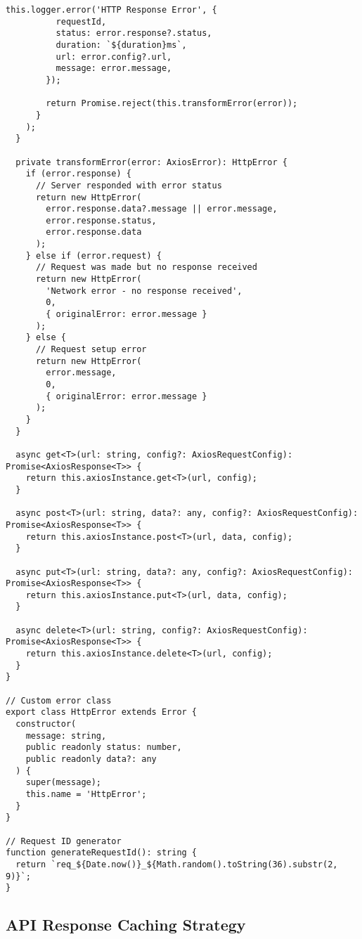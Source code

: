 \documentclass[11pt,a4paper]{article}
\begin{document}
\begin{lstlisting}[style=typescript, caption=HTTP Client with Interceptors]
        this.logger.error('HTTP Response Error', {
          requestId,
          status: error.response?.status,
          duration: `${duration}ms`,
          url: error.config?.url,
          message: error.message,
        });
        
        return Promise.reject(this.transformError(error));
      }
    );
  }
  
  private transformError(error: AxiosError): HttpError {
    if (error.response) {
      // Server responded with error status
      return new HttpError(
        error.response.data?.message || error.message,
        error.response.status,
        error.response.data
      );
    } else if (error.request) {
      // Request was made but no response received
      return new HttpError(
        'Network error - no response received',
        0,
        { originalError: error.message }
      );
    } else {
      // Request setup error
      return new HttpError(
        error.message,
        0,
        { originalError: error.message }
      );
    }
  }
  
  async get<T>(url: string, config?: AxiosRequestConfig): Promise<AxiosResponse<T>> {
    return this.axiosInstance.get<T>(url, config);
  }
  
  async post<T>(url: string, data?: any, config?: AxiosRequestConfig): Promise<AxiosResponse<T>> {
    return this.axiosInstance.post<T>(url, data, config);
  }
  
  async put<T>(url: string, data?: any, config?: AxiosRequestConfig): Promise<AxiosResponse<T>> {
    return this.axiosInstance.put<T>(url, data, config);
  }
  
  async delete<T>(url: string, config?: AxiosRequestConfig): Promise<AxiosResponse<T>> {
    return this.axiosInstance.delete<T>(url, config);
  }
}

// Custom error class
export class HttpError extends Error {
  constructor(
    message: string,
    public readonly status: number,
    public readonly data?: any
  ) {
    super(message);
    this.name = 'HttpError';
  }
}

// Request ID generator
function generateRequestId(): string {
  return `req_${Date.now()}_${Math.random().toString(36).substr(2, 9)}`;
}
\end{lstlisting}

\subsection{API Response Caching Strategy}
\end{document}
